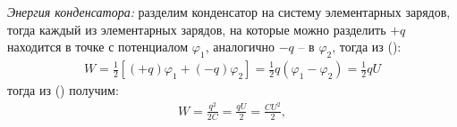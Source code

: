 \documentclass[__minimum__.tex]{subfiles}
\begin{document}
\emph{Энергия конденсатора:} разделим конденсатор на систему элементарных зарядов, тогда каждый из элементарных зарядов, на которые можно разделить $+q$ находится в точке с потенциалом $\varphi_1$, аналогично $-q$ -- в $\varphi_2$, тогда из ():
\begin{gather}
W
=
\frac{1}{2}\left[(+q)\varphi_{1}+(-q)\varphi_{2}\right]
=
\frac{1}{2}q(\varphi_1-\varphi_2)=\frac{1}{2}qU
\end{gather}
тогда из () получим:
\begin{gather}
W=\frac{q^2}{2C}=\frac{qU}{2}=\frac{CU^2}{2},
\end{gather}
\end{document}
